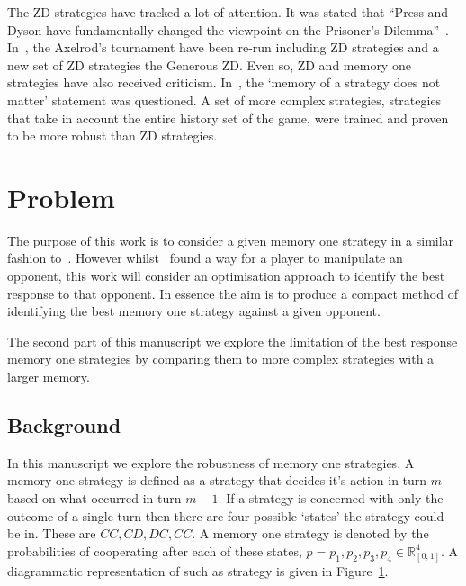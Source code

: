 \documentclass[10pt]{article}
\newcommand{\R}{\mathbb{R}}
\begin{document}
The ZD strategies have tracked a lot of attention. It was stated that
``Press and Dyson have fundamentally changed the viewpoint on the Prisoner's
Dilemma''~\cite{Stewart2012}. In~\cite{Stewart2012}, the Axelrod's
tournament have been re-run including ZD strategies and a new set of ZD
strategies the Generous ZD. Even so, ZD and memory one strategies have
also received criticism. In~\cite{Harper2015}, the `memory of a strategy does
not matter' statement was questioned. A set of more complex strategies,
strategies that take in account the entire history set of the game, were
trained and proven to be more robust than ZD strategies.

\section{Problem}

The purpose of this work is to consider a given memory one strategy 
in a similar fashion to~\cite{Press2012}. However whilst~\cite{Press2012} found
a way for a player to manipulate an opponent, this work will consider an
optimisation approach to identify the best response to that opponent.
In essence the aim is to produce a compact method of identifying the best memory
one strategy against a given opponent.

The second part of this manuscript we explore the limitation of the best response
memory one strategies by comparing them to more complex strategies with a larger
memory.

\subsection{Background}

In this manuscript we explore the robustness of memory one strategies.
A memory one strategy is defined as a strategy that decides it's action in turn
\(m\) based on what occurred in turn \(m - 1\). If a strategy is concerned with
only the outcome of a single turn then there are four possible `states' the
strategy could be in. These are \(CC, CD, DC,CC\). A memory one strategy is denoted
by the probabilities of cooperating after each of these states,
\(p=p_1, p_2, p_3, p_4 \in \R_{[0,1]} ^ 4\). A diagrammatic representation of
such as strategy is given in Figure~\ref{fig:diagram_mem_one}.

\begin{figure}
    \centering
    \begin{subfigure}{0.45\textwidth}
        
        \label{fig:diagram_mem_one}
    \end{subfigure}
    \begin{subfigure}{0.45\textwidth}
        
        \label{fig:markov_chain}
    \end{subfigure}
\end{figure}
\end{document}
